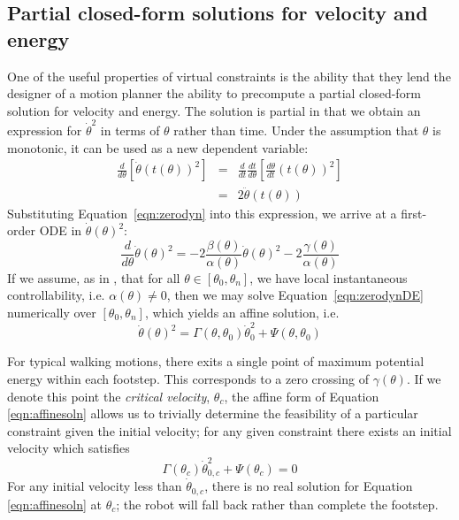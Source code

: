 \subsection{Partial closed-form solutions for velocity and energy}
One of the useful properties of virtual constraints is the ability that they lend the designer of a motion planner the ability to precompute a partial closed-form solution for velocity and energy. The solution is partial in that we obtain an expression for $\dot{\theta}^2$ in terms of $\theta$ rather than time. Under the assumption that $\theta$ is monotonic, it can be used as a new dependent variable:
\begin{eqnarray}
	\frac{d}{d\theta}\left[\dot{\theta}\left(t(\theta)\right)^2\right] &=& 
	\frac{d}{dt}\frac{dt}{d\theta}\left[\frac{d\theta}{dt}\left(t(\theta)\right)^2\right] \nonumber \\ 
	&=& 2\ddot{\theta}\left(t(\theta)\right)
\end{eqnarray}
Substituting Equation~\ref{eqn:zerodyn} into this expression, we arrive at a first-order ODE in $\dot{\theta}(\theta)^2$:
\begin{equation}\label{eqn:zerodynDE}
	\frac{d}{d\theta}\dot{\theta}(\theta)^2 = -2\frac{\beta(\theta)}{\alpha(\theta)}
		\dot{\theta}(\theta)^2 - 2\frac{\gamma(\theta)}{\alpha(\theta)}
\end{equation}
If we assume, as in \cite{manchester13planning}, that for all $\theta \in [\theta_0, \theta_n]$, we have local instantaneous controllability, i.e. $\alpha(\theta) \neq 0$, then we may solve Equation~\ref{eqn:zerodynDE} numerically over $[\theta_0, \theta_n]$, which yields an affine solution, i.e.
\begin{equation} \label{eqn:affinesoln}
	\dot{\theta}(\theta)^2 = \Gamma(\theta, \theta_0)\dot{\theta}_0^2 + \Psi(\theta, \theta_0)
\end{equation}

For typical walking motions, there exits a single point of maximum potential energy within each footstep. This corresponds to a zero crossing of $\gamma(\theta)$. If we denote this point the \textit{critical velocity}, $\theta_c$, the affine form of Equation \ref{eqn:affinesoln} allows us to trivially determine the feasibility of a particular constraint given the initial velocity; for any given constraint there exists an initial velocity which satisfies
\begin{equation} \label{eqn:critvel}
	\Gamma(\theta_c)\dot{\theta}_{0,c}^2 + \Psi(\theta_c) = 0
\end{equation}
For any initial velocity less than $\dot{\theta}_{0,c}$, there is no real solution for Equation \ref{eqn:affinesoln} at $\theta_c$; the robot will fall back rather than complete the footstep.

